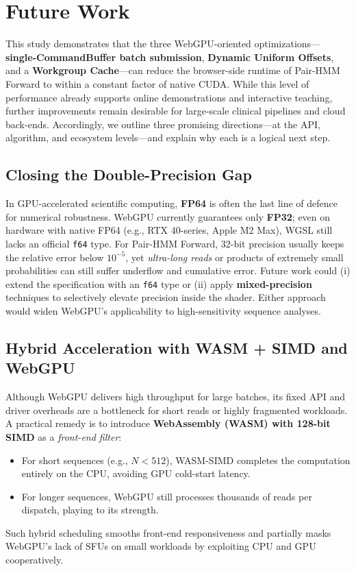 \documentclass[12pt]{report}
\begin{document}
\chapter{Future Work}
This study demonstrates that the three WebGPU-oriented optimizations—\textbf{single-CommandBuffer batch submission}, \textbf{Dynamic Uniform Offsets}, and a \textbf{Workgroup Cache}—can reduce the browser-side runtime of Pair-HMM Forward to within a constant factor of native CUDA. While this level of performance already supports online demonstrations and interactive teaching, further improvements remain desirable for large-scale clinical pipelines and cloud back-ends. Accordingly, we outline three promising directions—at the API, algorithm, and ecosystem levels—and explain why each is a logical next step.

\section{Closing the Double-Precision Gap}
In GPU-accelerated scientific computing, \textbf{FP64} is often the last line of defence for numerical robustness. WebGPU currently guarantees only \textbf{FP32}; even on hardware with native FP64 (e.g., RTX 40-series, Apple M2 Max), WGSL still lacks an official \texttt{f64} type. For Pair-HMM Forward, 32-bit precision usually keeps the relative error below $10^{-5}$, yet \emph{ultra-long reads} or products of extremely small probabilities can still suffer underflow and cumulative error. Future work could (i) extend the specification with an \texttt{f64} type or (ii) apply \textbf{mixed-precision} techniques to selectively elevate precision inside the shader. Either approach would widen WebGPU’s applicability to high-sensitivity sequence analyses.

\section{Hybrid Acceleration with WASM + SIMD and WebGPU}
Although WebGPU delivers high throughput for large batches, its fixed API and driver overheads are a bottleneck for short reads or highly fragmented workloads. A practical remedy is to introduce \textbf{WebAssembly (WASM) with 128-bit SIMD} as a \emph{front-end filter}:
\begin{itemize}
    \item For short sequences (e.g., $N<512$), WASM-SIMD completes the computation entirely on the CPU, avoiding GPU cold-start latency.
    \item For longer sequences, WebGPU still processes thousands of reads per dispatch, playing to its strength.
\end{itemize}
Such hybrid scheduling smooths front-end responsiveness and partially masks WebGPU’s lack of SFUs on small workloads by exploiting CPU and GPU cooperatively.
\end{document}
